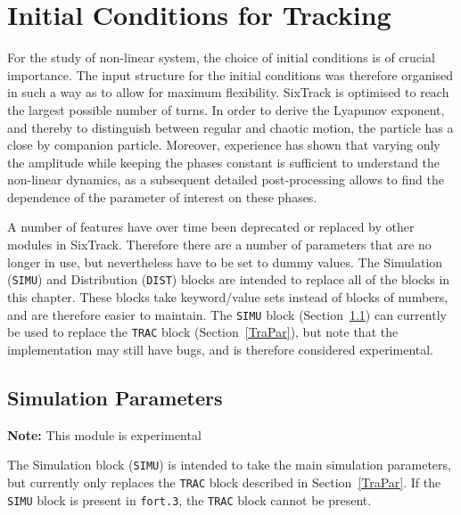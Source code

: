 
\chapter{Initial Conditions for Tracking} \label{InitCondTrack}

For the study of non-linear system, the choice of initial conditions is of crucial importance.
The input structure for the initial conditions was therefore organised in such a way as to allow for maximum flexibility.
SixTrack is optimised to reach the largest possible number of turns.
In order to derive the Lyapunov exponent, and thereby to distinguish between regular and chaotic motion, the particle has a close by companion particle.
Moreover, experience has shown that varying only the amplitude while keeping the phases constant is sufficient to understand the non-linear dynamics, as a subsequent detailed post-processing allows to find the dependence of the parameter of interest on these phases.

A number of features have over time been deprecated or replaced by other modules in SixTrack.
Therefore there are a number of parameters that are no longer in use, but nevertheless have to be set to dummy values.
The Simulation (\texttt{SIMU}) and Distribution (\texttt{DIST}) blocks are intended to replace all of the blocks in this chapter.
These blocks take keyword/value sets instead of blocks of numbers, and are therefore easier to maintain.
The \texttt{SIMU} block (Section~\ref{Input:SIMU}) can currently be used to replace the \texttt{TRAC} block (Section~\ref{TraPar}), but note that the implementation may still have bugs, and is therefore considered experimental.

\section{Simulation Parameters} \label{Input:SIMU}

\textcolor{notered}{\textbf{Note:} This module is experimental}

\bigskip
The Simulation block (\texttt{SIMU}) is intended to take the main simulation parameters, but currently only replaces the \texttt{TRAC} block described in Section~\ref{TraPar}.
If the \texttt{SIMU} block is present in \texttt{fort.3}, the \texttt{TRAC} block cannot be present.

